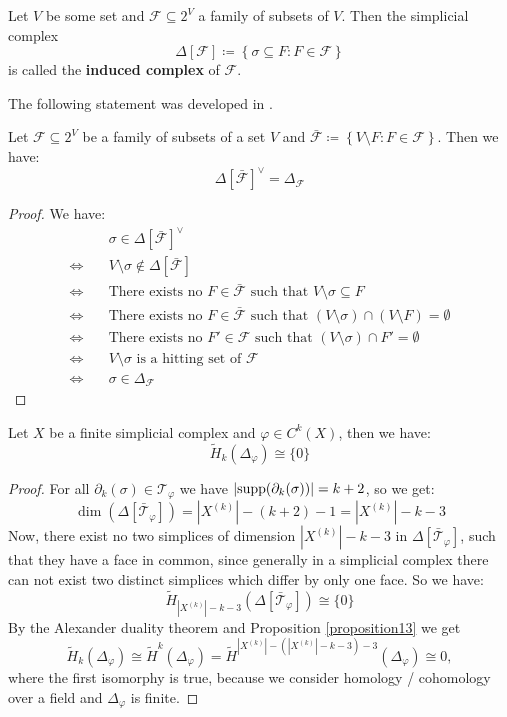 \begin{defi}
Let \(V\) be some set and \(\mathcal{F}\subseteq 2^V\) a family of subsets of \(V\). Then the simplicial complex
\[
\Delta\left[\mathcal{F}\right]\coloneqq \left\{\sigma\subseteq F:F\in\mathcal{F}\right\}
\]
is called the \textbf{induced complex} of \(\mathcal{F}\). 
\end{defi}

The following statement was developed in \cite{9}.

\begin{prop}\label{proposition13}
Let \(\mathcal{F}\subseteq 2^V\) be a family of subsets of a set \(V\) and \(\bar{\mathcal{F}}\coloneqq \left\{V\setminus F:F\in\mathcal{F}\right\}\). Then we have:
\[
\Delta\left[\bar{\mathcal{F}}\right]^{\lor}=\Delta_{\mathcal{F}}
\]
\begin{proof}
We have:
\begin{align*}
  & \sigma\in\Delta\left[\bar{\mathcal{F}}\right]^{\lor} \\
  \Longleftrightarrow \quad & V\setminus\sigma\notin\Delta\left[\bar{\mathcal{F}}\right] \\
  \Longleftrightarrow \quad & \text{There exists no } F\in\bar{\mathcal{F}}\text{ such that }V\setminus\sigma\subseteq F \\
  \Longleftrightarrow \quad & \text{There exists no } F\in\bar{\mathcal{F}}\text{ such that }(V\setminus\sigma)\cap(V\setminus F)=\emptyset \\
  \Longleftrightarrow \quad & \text{There exists no } F'\in\mathcal{F}\text{ such that }(V\setminus\sigma)\cap F'=\emptyset \\
  \Longleftrightarrow \quad & V\setminus\sigma\text{ is a hitting set of }\mathcal{F} \\
  \Longleftrightarrow \quad & \sigma\in\Delta_{\mathcal{F}}
 \end{align*}
\end{proof}
\end{prop}

\begin{thm}
Let \(X\) be a finite simplicial complex and \(\varphi\in C^k(X)\), then we have:
\[
\tilde{H}_k(\Delta_{\varphi})\cong\{0\}
\]
\begin{proof}
For all \(\partial_k(\sigma)\in\mathcal{T}_{\varphi}\) we have \(|\mathrm{supp}(\partial_k(\sigma))|=k+2\), so we get:
\[
\dim(\Delta[\bar{\mathcal{T}}_{\varphi}])=|X^{(k)}|-(k+2)-1=|X^{(k)}|-k-3
\]
Now, there exist no two simplices of dimension \(|X^{(k)}|-k-3\) in \(\Delta[\bar{\mathcal{T}}_{\varphi}]\), such that they have a face in common, since generally in a simplicial complex there can not exist two distinct simplices which differ by only one face. So we have:
\[
\tilde{H}_{|X^{(k)}|-k-3}(\Delta[\bar{\mathcal{T}}_{\varphi}])\cong\{0\}
\]
By the Alexander duality theorem and Proposition \ref{proposition13} we get
\[
\tilde{H}_k(\Delta_{\varphi})\cong\tilde{H}^k(\Delta_{\varphi})=\tilde{H}^{|X^{(k)}|-(|X^{(k)}|-k-3)-3}(\Delta_{\varphi})\cong 0,
\]
where the first isomorphy is true, because we consider homology / cohomology over a field and \(\Delta_{\varphi}\) is finite.
\end{proof}
\end{thm}

